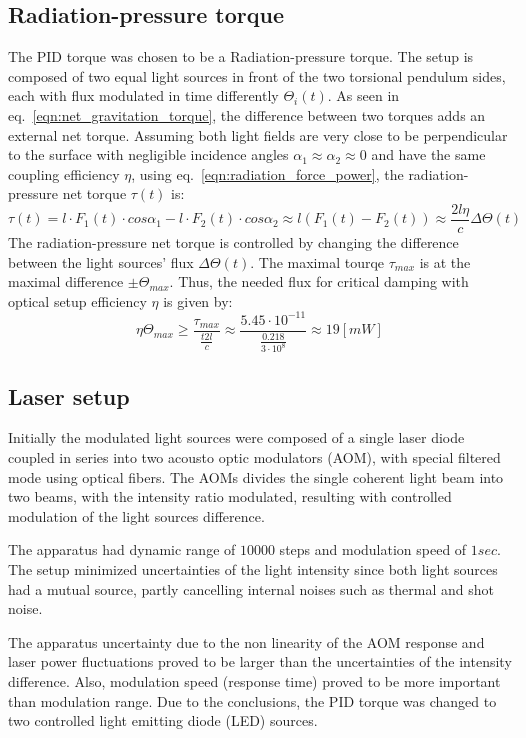 \documentclass[\main/master.tex]{subfiles}
\begin{document}
\subsection{Radiation-pressure torque}
The PID torque was chosen to be a Radiation-pressure torque. The setup is composed of two equal light sources in front of the two torsional pendulum sides, each with flux modulated in time differently $\Theta_i(t)$. As seen in eq.~\ref{eqn:net_gravitation_torque}, the difference between two torques adds an external net torque. Assuming both light fields are very close to be perpendicular to the surface with negligible incidence angles $\alpha_1\approx\alpha_2\approx 0$ and have the same coupling efficiency $\eta$, using eq.~\ref{eqn:radiation_force_power}, the radiation-pressure net torque $\tau(t)$ is:  
\begin{equation}
\tau(t) = l\cdot F_1(t) \cdot cos\alpha_1 - l\cdot F_2(t) \cdot cos\alpha_2\approx l(F_1(t) - F_2(t)) \approx \frac{2l\eta}{{c}} \Delta \Theta(t) \label{eqn:radiation torque}
\end{equation}
The radiation-pressure net torque is controlled by changing the difference between the light sources' flux $\Delta \Theta(t)$. The maximal tourqe $\tau_{max}$ is at the maximal difference $\pm \Theta_{max}$. Thus, the needed flux for critical damping with optical setup efficiency $\eta$ is given by: 
\begin{equation}
\eta\Theta_{max} \geq \frac{\tau_{max}}{\frac{t2 l}{c}}\approx \frac{5.45\cdot10^{-11}}{\frac{ 0.218}{3\cdot10^{8}}}\approx 19 [mW]
\label{eqn:max radiation torque}
\end{equation}

\subsection{Laser setup}
Initially the modulated light sources were composed of a single laser diode coupled in series into two acousto optic modulators (AOM), with special filtered mode using optical fibers. The AOMs divides the single coherent light beam into two beams, with the intensity ratio modulated, resulting with controlled modulation of the light sources difference.
\par\noindent
The apparatus had dynamic range of $10000$ steps and modulation speed of $1 sec$. The setup minimized uncertainties of the light intensity since both light sources had a mutual source, partly cancelling internal noises such as thermal and shot noise. 
\par\noindent
The apparatus uncertainty due to the non linearity of the AOM response and laser power fluctuations proved to be larger than the uncertainties of the intensity difference. Also, modulation speed (response time) proved to be more important than modulation range. Due to the conclusions, the PID torque was changed to two controlled light emitting diode (LED) sources.
\end{document}
